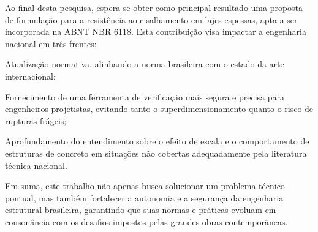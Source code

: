 Ao final desta pesquisa, espera-se obter como principal resultado uma proposta de formulação para a resistência ao cisalhamento em lajes espessas, apta a ser incorporada na ABNT NBR 6118. Esta contribuição visa impactar a engenharia nacional em três frentes: 

\begin{alineas}
	\item Atualização normativa, alinhando a norma brasileira com o estado da arte internacional;
	\item Fornecimento de uma ferramenta de verificação mais segura e precisa para engenheiros projetistas, evitando tanto o superdimensionamento quanto o risco de rupturas frágeis;
	\item Aprofundamento do entendimento sobre o efeito de escala e o comportamento de estruturas de concreto em situações não cobertas adequadamente pela literatura técnica nacional.
\end{alineas}

Em suma, este trabalho não apenas busca solucionar um problema técnico pontual, mas também fortalecer a autonomia e a segurança da engenharia estrutural brasileira, garantindo que suas normas e práticas evoluam em consonância com os desafios impostos pelas grandes obras contemporâneas.


\postextual

\nocite{*}

%
\printbibliography



%
%






